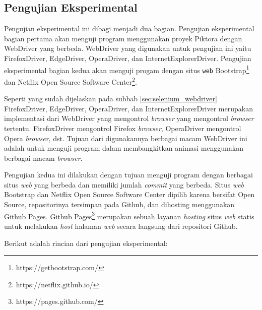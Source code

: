\subsection{Pengujian Eksperimental}
\label{sec:pengujian_eksperimental} 
Pengujian eksperimental ini dibagi menjadi dua bagian. Pengujian eksperimental bagian pertama akan menguji program menggunakan proyek Piktora dengan WebDriver yang berbeda. WebDriver yang digunakan untuk pengujian ini yaitu FirefoxDriver, EdgeDriver, OperaDriver, dan InternetExplorerDriver. Pengujian eksperimental bagian kedua akan menguji progam dengan situs \texttt{web} Bootstrap\footnote{https://getbootstrap.com/} dan Netflix Open Source Software Center\footnote{https://netflix.github.io/}. 

Seperti yang sudah dijelaskan pada subbab \ref{sec:selenium_webdriver} FirefoxDriver, EdgeDriver, OperaDriver, dan InternetExplorerDriver merupakan implementasi dari WebDriver yang mengontrol \textit{browser} yang mengontrol \textit{browser} tertentu. FirefoxDriver mengontrol Firefox \textit{browser}, OperaDriver mengontrol Opera \textit{browser}, dst. Tujuan dari digunakannya berbagai macam WebDriver ini adalah untuk menguji program dalam membangkitkan animasi menggunakan berbagai macam \textit{browser}.

Pengujian kedua ini dilakukan dengan tujuan menguji program dengan berbagai situs \textit{web} yang berbeda dan memiliki jumlah \textit{commit} yang berbeda. Situs \textit{web} Bootstrap dan Netflix Open Source Software Center dipilih karena bersifat Open Source, repositorinya tersimpan pada Github, dan dihosting menggunakan Github Pages. Github Pages\footnote{https://pages.github.com/} merupakan sebuah layanan \textit{hosting} situs \textit{web} statis untuk melakukan \textit{host} halaman \textit{web} secara langsung dari repositori Github.     

Berikut adalah rincian dari pengujian eksperimental:

